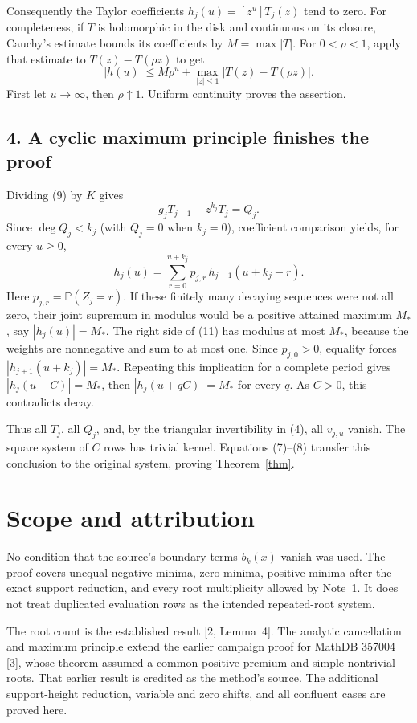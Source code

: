 \documentclass[11pt]{article}
\newcommand{\Pp}{\mathbb P}
\begin{document}
Consequently the Taylor coefficients
\(h_j(u)=[z^u]T_j(z)\) tend to zero. For completeness, if
\(T\) is holomorphic in the disk and continuous on its closure,
Cauchy's estimate bounds its coefficients by
\(M=\max|T|\). For \(0<\rho<1\), apply that estimate to
\(T(z)-T(\rho z)\) to get
\[
 |h(u)|\leq M\rho^u+
      \max_{|z|\leq1}|T(z)-T(\rho z)|.
 \]
First let \(u\to\infty\), then \(\rho\uparrow1\).
Uniform continuity proves the assertion.

\subsection*{4. A cyclic maximum principle finishes the proof}
Dividing (9) by \(K\) gives
\[
 g_jT_{j+1}-z^{k_j}T_j=Q_j.
\]
Since \(\deg Q_j<k_j\) (with \(Q_j=0\) when \(k_j=0\)),
coefficient comparison yields, for every \(u\geq0\),
\[
 h_j(u)=\sum_{r=0}^{u+k_j}p_{j,r}\,
                        h_{j+1}(u+k_j-r).                 \tag{11}
\]
Here \(p_{j,r}=\Pp(Z_j=r)\).
If these finitely many decaying sequences were not all zero,
their joint supremum in modulus would be a positive attained
maximum \(M_*\), say \(|h_j(u)|=M_*\).
The right side of (11) has modulus at most \(M_*\), because
the weights are nonnegative and sum to at most one.
Since \(p_{j,0}>0\), equality forces
\(|h_{j+1}(u+k_j)|=M_*\).
Repeating this implication for a complete period gives
\(|h_j(u+C)|=M_*\), then \(|h_j(u+qC)|=M_*\) for every \(q\).
As \(C>0\), this contradicts decay.

Thus all \(T_j\), all \(Q_j\), and, by the triangular
invertibility in (4), all \(v_{j,u}\) vanish. The square
system of \(C\) rows has trivial kernel. Equations (7)--(8)
transfer this conclusion to the original system, proving
Theorem~\ref{thm}.

\section*{Scope and attribution}
No condition that the source's boundary terms \(b_k(x)\) vanish
was used. The proof covers unequal negative minima, zero minima,
positive minima after the exact support reduction, and every
root multiplicity allowed by Note~1. It does not treat duplicated
evaluation rows as the intended repeated-root system.

The root count is the established result [2, Lemma~4].
The analytic cancellation and maximum principle extend the
earlier campaign proof for MathDB 357004 [3], whose theorem
assumed a common positive premium and simple nontrivial roots.
That earlier result is credited as the method's source.
The additional support-height reduction, variable and zero shifts,
and all confluent cases are proved here.
\end{document}
